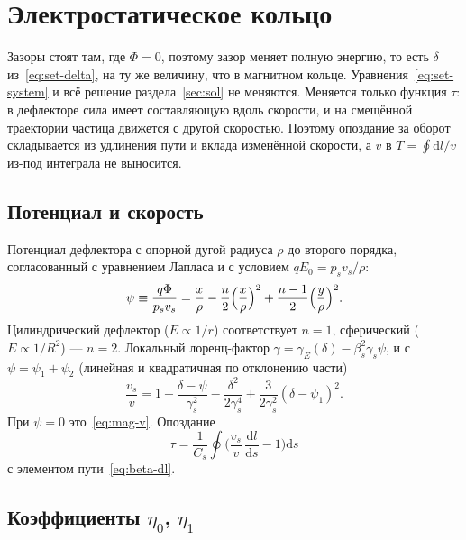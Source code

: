 \section{Электростатическое кольцо}
\label{sec:es}

Зазоры стоят там, где $\Phi=0$, поэтому зазор меняет полную энергию, то есть $\delta$ из~\eqref{eq:set-delta}, на ту же величину, что в магнитном кольце. Уравнения~\eqref{eq:set-system} и всё решение раздела~\ref{sec:sol} не меняются. Меняется только функция $\tau$: в дефлекторе сила имеет составляющую вдоль скорости, и на смещённой траектории частица движется с другой скоростью. Поэтому опоздание за оборот складывается из удлинения пути и вклада изменённой скорости, а $v$ в $T=\oint\mathrm{d}l/v$ из-под интеграла не выносится.

\subsection{Потенциал и скорость}

Потенциал дефлектора с опорной дугой радиуса $\rho$ до второго порядка, согласованный с уравнением Лапласа и с условием $qE_0=p_sv_s/\rho$:
\begin{equation}
\label{eq:es-phi}
\psi\equiv\frac{q\Phi}{p_sv_s}=\frac{x}{\rho}-\frac{n}{2}\Bigl(\frac{x}{\rho}\Bigr)^2+\frac{n-1}{2}\Bigl(\frac{y}{\rho}\Bigr)^2.
\end{equation}
Цилиндрический дефлектор ($E\propto1/r$) соответствует $n=1$, сферический ($E\propto1/R^2$) --- $n=2$. Локальный лоренц-фактор $\gamma=\gamma_E(\delta)-\beta_s^2\gamma_s\psi$, и с $\psi=\psi_1+\psi_2$ (линейная и квадратичная по отклонению части)
\begin{equation}
\label{eq:es-speed}
\frac{v_s}{v}=1-\frac{\delta-\psi}{\gamma_s^2}-\frac{\delta^2}{2\gamma_s^4}+\frac{3}{2\gamma_s^2}(\delta-\psi_1)^2.
\end{equation}
При $\psi=0$ это~\eqref{eq:mag-v}. Опоздание
\begin{equation}
\label{eq:es-tau}
\tau=\frac{1}{C_s}\oint\Biggl(\frac{v_s}{v}\,\frac{\mathrm{d}l}{\mathrm{d}s}-1\Biggr)\mathrm{d}s
\end{equation}
с элементом пути~\eqref{eq:beta-dl}.

\subsection{Коэффициенты $\eta_0$, $\eta_1$}

